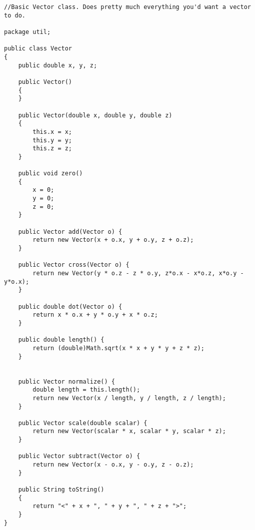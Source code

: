 \documentclass[10pt]{article}
\begin{document}
\begin{verbatim}
//Basic Vector class. Does pretty much everything you'd want a vector to do.

package util;

public class Vector 
{
	public double x, y, z;
	
	public Vector() 
	{
	}
	
	public Vector(double x, double y, double z) 
	{
		this.x = x;
		this.y = y;
		this.z = z;
	}
	
	public void zero()
	{
		x = 0;
		y = 0;
		z = 0;
	}
	
	public Vector add(Vector o) {
		return new Vector(x + o.x, y + o.y, z + o.z);
	}
	
	public Vector cross(Vector o) {
		return new Vector(y * o.z - z * o.y, z*o.x - x*o.z, x*o.y - y*o.x);
	}
	
	public double dot(Vector o) {
		return x * o.x + y * o.y + x * o.z;
	}
	
	public double length() {
		return (double)Math.sqrt(x * x + y * y + z * z);
	}
	
	
	public Vector normalize() {
		double length = this.length();
		return new Vector(x / length, y / length, z / length);
	}
	
	public Vector scale(double scalar) {
		return new Vector(scalar * x, scalar * y, scalar * z);
	}
	
	public Vector subtract(Vector o) {
		return new Vector(x - o.x, y - o.y, z - o.z);
	}
	
	public String toString()
	{
		return "<" + x + ", " + y + ", " + z + ">";
	}
}

\end{verbatim}
\end{document}
